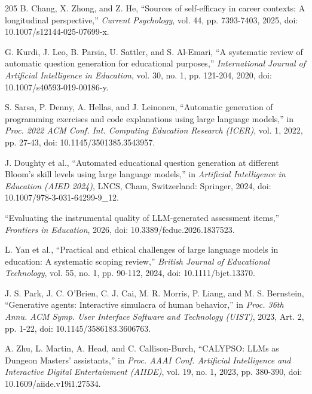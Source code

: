 \begin{thebibliography}{205}
 B. Chang, X. Zhong, and Z. He, ``Sources of self-\allowbreak{}efficacy in career contexts: A longitudinal perspective,'' \textit{Current Psychology}, vol. 44, pp. 7393-7403, 2025, doi: 10.\allowbreak{}1007/\allowbreak{}s12144-\allowbreak{}025-\allowbreak{}07699-\allowbreak{}x.

 G. Kurdi, J. Leo, B. Parsia, U. Sattler, and S. Al-Emari, ``A systematic review of automatic question generation for educational purposes,'' \textit{International Journal of Artificial Intelligence in Education}, vol. 30, no. 1, pp. 121-204, 2020, doi: 10.\allowbreak{}1007/\allowbreak{}s40593-\allowbreak{}019-\allowbreak{}00186-\allowbreak{}y.

 S. Sarsa, P. Denny, A. Hellas, and J. Leinonen, ``Automatic generation of programming exercises and code explanations using large language models,'' in \textit{Proc. 2022 ACM Conf. Int. Computing Education Research (ICER)}, vol. 1, 2022, pp. 27-43, doi: 10.\allowbreak{}1145/\allowbreak{}3501385.\allowbreak{}3543957.

 J. Doughty et al., ``Automated educational question generation at different Bloom's skill levels using large language models,'' in \textit{Artificial Intelligence in Education (AIED 2024)}, LNCS, Cham, Switzerland: Springer, 2024, doi: 10.\allowbreak{}1007/\allowbreak{}978-\allowbreak{}3-\allowbreak{}031-\allowbreak{}64299-\allowbreak{}9\_\allowbreak{}12.

 ``Evaluating the instrumental quality of LLM-\allowbreak{}generated assessment items,'' \textit{Frontiers in Education}, 2026, doi: 10.\allowbreak{}3389/\allowbreak{}feduc.\allowbreak{}2026.\allowbreak{}1837523.

 L. Yan et al., ``Practical and ethical challenges of large language models in education: A systematic scoping review,'' \textit{British Journal of Educational Technology}, vol. 55, no. 1, pp. 90-112, 2024, doi: 10.\allowbreak{}1111/\allowbreak{}bjet.\allowbreak{}13370.

 J. S. Park, J. C. O'Brien, C. J. Cai, M. R. Morris, P. Liang, and M. S. Bernstein, ``Generative agents: Interactive simulacra of human behavior,'' in \textit{Proc. 36th Annu. ACM Symp. User Interface Software and Technology (UIST)}, 2023, Art. 2, pp. 1-22, doi: 10.\allowbreak{}1145/\allowbreak{}3586183.\allowbreak{}3606763.

 A. Zhu, L. Martin, A. Head, and C. Callison-\allowbreak{}Burch, ``CALYPSO: LLMs as Dungeon Masters' assistants,'' in \textit{Proc. AAAI Conf. Artificial Intelligence and Interactive Digital Entertainment (AIIDE)}, vol. 19, no. 1, 2023, pp. 380-390, doi: 10.\allowbreak{}1609/\allowbreak{}aiide.\allowbreak{}v19i1.\allowbreak{}27534.


\end{thebibliography}
